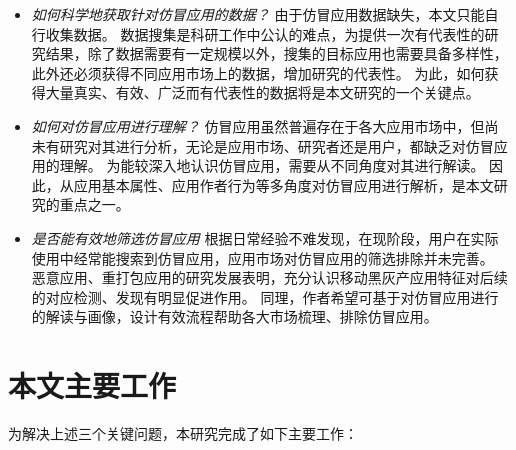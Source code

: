 \begin{itemize}
	\setlength{\itemsep}{1pt}
	      \setlength{\parskip}{0pt}
	      \setlength{\parsep}{0pt}
	\item \emph{如何科学地获取针对仿冒应用的数据？} \quad
	      由于仿冒应用数据缺失，本文只能自行收集数据。
	      数据搜集是科研工作中公认的难点，为提供一次有代表性的研究结果，除了数据需要有一定规模以外，搜集的目标应用也需要具备多样性，此外还必须获得不同应用市场上的数据，增加研究的代表性。
	      为此，如何获得大量真实、有效、广泛而有代表性的数据将是本文研究的一个关键点。

	\item \emph{如何对仿冒应用进行理解？} \quad
	      仿冒应用虽然普遍存在于各大应用市场中，但尚未有研究对其进行分析，无论是应用市场、研究者还是用户，都缺乏对仿冒应用的理解。
	      为能较深入地认识仿冒应用，需要从不同角度对其进行解读。
	      因此，从应用基本属性、应用作者行为等多角度对仿冒应用进行解析，是本文研究的重点之一。

	\item \emph{是否能有效地筛选仿冒应用} \quad
	      根据日常经验不难发现，在现阶段，用户在实际使用中经常能搜索到仿冒应用，应用市场对仿冒应用的筛选排除并未完善。
	      恶意应用、重打包应用的研究发展表明，充分认识移动黑灰产应用特征对后续的对应检测、发现有明显促进作用。
	      同理，作者希望可基于对仿冒应用进行的解读与画像，设计有效流程帮助各大市场梳理、排除仿冒应用。
\end{itemize}

\section{本文主要工作}
为解决上述三个关键问题，本研究完成了如下主要工作：

